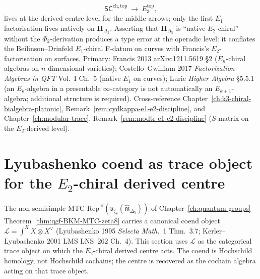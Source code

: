 \begin{remark}
\[ \mathsf{SC}^{\mathrm{ch,top}}\ \to\ E_3^{\mathrm{top}},
\]
lives at the derived-centre level for the middle arrows; only the
first $E_1$-factorisation lives natively on $\mathbf H_{\Delta_5}$.
Asserting that $\mathbf H_{\Delta_5}$ is ``native $E_2$-chiral''
without the $\Phi_2$-derivation produces a type error at the operadic
level: it conflates the Beilinson--Drinfeld $E_1$-chiral F-datum on
curves with Francis's $E_2$-factorisation on surfaces.
Primary: Francis 2013 arXiv:1211.5619 \S2 ($E_n$-chiral algebras on
$n$-dimensional varieties); Costello--Gwilliam 2017 \emph{Factorization
Algebras in QFT} Vol.~I Ch.~5 (native $E_1$ on curves); Lurie
\emph{Higher Algebra} \S5.5.1 (an $E_k$-algebra in a presentable
$\infty$-category is not automatically an $E_{k+1}$-algebra;
additional structure is required). Cross-reference
Chapter~\ref{ch:k3-chiral-bialgebra-platonic},
Remark~\ref{rem:cydkappa-e1-e2-discipline}, and
Chapter~\ref{ch:modular-trace},
Remark~\ref{rem:modtr-e1-e2-discipline} ($S$-matrix on the
$E_2$-derived level).
\end{remark}

\section{Lyubashenko coend as trace object for the \texorpdfstring{$E_2$}{E-2}-chiral derived centre}
\label{sec:e2ca-lyubashenko-coend-derived-centre}

The non-semisimple MTC
$\mathrm{Rep}^{\mathrm{fd}}(\mathfrak u_{\zeta_8}
(\widehat{\mathfrak m}_{\Delta_5}))$ of
Chapter~\ref{ch:quantum-groups}
Theorem~\ref{thm:qgf-BKM-MTC-zeta8} carries a canonical coend object
$\mathcal L = \int^X X\otimes X^\vee$ (Lyubashenko 1995
\emph{Selecta Math.}~1 Thm.~3.7; Kerler--Lyubashenko 2001 LMS LNS~262
Ch.~4). This section uses $\mathcal L$ as the categorical trace
object on which the $E_2$-chiral derived centre acts. The coend is
Hochschild homology, not Hochschild cochains; the centre is recovered
as the cochain algebra acting on that trace object.

